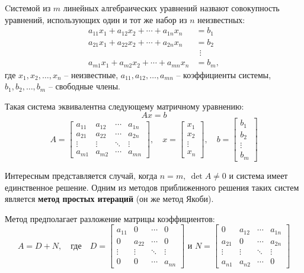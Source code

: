 \documentclass[lab1-report.tex]{subfiles}
\begin{document}
    Cистемой из $m$ линейных алгебраических уравнений назвают совокупность уравнений,
    использующих один и тот же набор из $n$ неизвестных:
    \[\begin{aligned}
          a_{11}x_{1}+a_{12}x_{2}+ \cdots +a_{1n}x_{n} & =b_{1} \\
          a_{21}x_{1}+a_{22}x_{2}+ \cdots +a_{2n}x_{n} & =b_{2} \\
          &\ \ \vdots \\
          a_{m1}x_{1}+a_{m2}x_{2}+ \cdots +a_{mn}x_{n} & =b_{m},
    \end{aligned}\]
    где $x_{1},x_{2},\ldots,x_{n}$ -- неизвестные, $a_{11},a_{12},\ldots,a_{mn}$ -- коэффициенты системы,
    $b_{1},b_{2},\ldots,b_{m}$ -- свободные члены.

    Такая система эквивалентна следующему матричному уравнению:
    \[Ax=b\]
    \[A={\begin{bmatrix}
             a_{11} & a_{12} & \cdots & a_{1n} \\
             a_{21} & a_{22} & \cdots & a_{2n} \\
             \vdots & \vdots & \ddots & \vdots \\
             a_{m1} & a_{m2} & \cdots & a_{mn}
    \end{bmatrix}}, \quad
    x = {\begin{bmatrix}
             x_{1} \\ x_{2} \\ \vdots \\x_{n}
    \end{bmatrix}}, \quad
    b ={\begin{bmatrix}
            b_{1} \\ b_{2} \\ \vdots \\ b_{m}
    \end{bmatrix}}\]

    Интересным представляется случай, когда $n=m, \ \det{A} \ne 0$ и система имеет единственное решение.
    Одним из методов приближенного решения таких систем является \textbf{метод простых итераций} (он же метод Якоби).

    Метод предполагает разложение матрицы коэффициентов:
    \[A=D+N, \quad \text{где} \quad
    D={\begin{bmatrix}
           a_{11} & 0      & \cdots & 0      \\
           0      & a_{22} & \cdots & 0      \\
           \vdots & \vdots & \ddots & \vdots \\
           0      & 0      & \cdots & a_{nn}
    \end{bmatrix}}
        {\text{ и }}
    N={\begin{bmatrix}
           0      & a_{12} & \cdots & a_{1n} \\
           a_{21} & 0      & \cdots & a_{2n} \\
           \vdots & \vdots & \ddots & \vdots \\
           a_{n1} & a_{n2} & \cdots & 0
    \end{bmatrix}}\]
\end{document}
